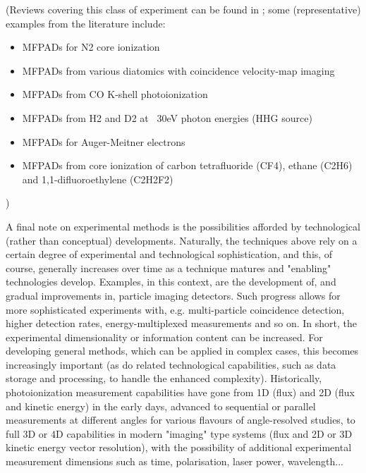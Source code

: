 (Reviews covering this class of experiment can be found in  \cite{Yagishita2005,Reid2012,Yagishita2015}; some (representative) examples from the literature include:
\begin{itemize}
\item MFPADs for N2 core ionization \cite{Shigemasa1995}
\item MFPADs from various diatomics with coincidence velocity-map imaging \cite{Eland2000}
\item MFPADs from CO K-shell photoionization \cite{motoki2000KshellPhotoionizationCO}

\item MFPADs from H2 and D2 at ~30eV photon energies (HHG source) \cite{Billaud2012a}
\item MFPADs for Auger-Meitner electrons \cite{Cryan2010,Cryan2012a}
\item MFPADs from core ionization of carbon tetrafluoride (CF4), ethane (C2H6) and 1,1-difluoroethylene (C2H2F2)\cite{Menssen2016}
\end{itemize}

)

A final note on experimental methods is the possibilities afforded by technological (rather than conceptual) developments. Naturally, the techniques above rely on a certain degree of experimental and technological sophistication, and this, of course, generally increases over time as a technique matures and "enabling" technologies develop. Examples, in this context, are the development of, and gradual improvements in, particle imaging detectors. Such progress allows for more sophisticated experiments with, e.g. multi-particle coincidence detection, higher detection rates, energy-multiplexed measurements and so on. In short, the experimental dimensionality or information content can be increased. For developing general methods, which can be applied in complex cases, this becomes increasingly important (as do related technological capabilities, such as data storage and processing, to handle the enhanced complexity). Historically, photoionization measurement capabilities have gone from 1D (flux) and 2D (flux and kinetic energy) in the early days, advanced to sequential or parallel measurements at different angles for various flavours of angle-resolved studies, to full 3D or 4D capabilities in modern "imaging" type systems (flux and 2D or 3D kinetic energy vector resolution), with the possibility of additional experimental measurement dimensions such as time, polarisation, laser power, wavelength...